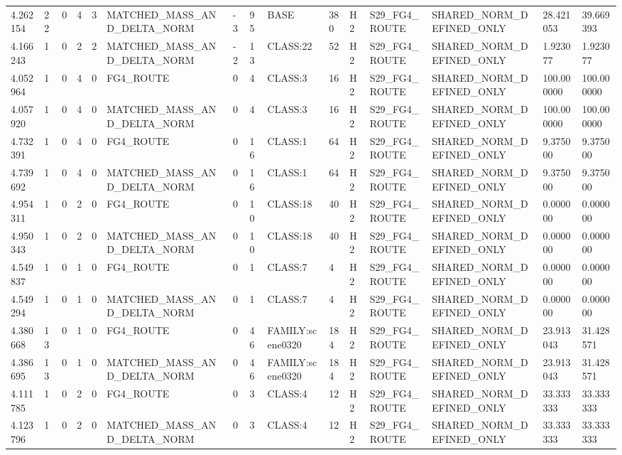\begin{tabular}{lllllllllllllll}
4.262154 & 22 & 0 & 4 & 3 & MATCHED\_MASS\_AND\_DELTA\_NORM & -3 & 95 & BASE & 380 & H2 & S29\_FG4\_ROUTE & SHARED\_NORM\_DEFINED\_ONLY & 28.421053 & 39.669393 \\
4.166243 & 1 & 0 & 2 & 2 & MATCHED\_MASS\_AND\_DELTA\_NORM & -2 & 13 & CLASS:22 & 52 & H2 & S29\_FG4\_ROUTE & SHARED\_NORM\_DEFINED\_ONLY & 1.923077 & 1.923077 \\
4.052964 & 1 & 0 & 4 & 0 & FG4\_ROUTE & 0 & 4 & CLASS:3 & 16 & H2 & S29\_FG4\_ROUTE & SHARED\_NORM\_DEFINED\_ONLY & 100.000000 & 100.000000 \\
4.057920 & 1 & 0 & 4 & 0 & MATCHED\_MASS\_AND\_DELTA\_NORM & 0 & 4 & CLASS:3 & 16 & H2 & S29\_FG4\_ROUTE & SHARED\_NORM\_DEFINED\_ONLY & 100.000000 & 100.000000 \\
4.732391 & 1 & 0 & 4 & 0 & FG4\_ROUTE & 0 & 16 & CLASS:1 & 64 & H2 & S29\_FG4\_ROUTE & SHARED\_NORM\_DEFINED\_ONLY & 9.375000 & 9.375000 \\
4.739692 & 1 & 0 & 4 & 0 & MATCHED\_MASS\_AND\_DELTA\_NORM & 0 & 16 & CLASS:1 & 64 & H2 & S29\_FG4\_ROUTE & SHARED\_NORM\_DEFINED\_ONLY & 9.375000 & 9.375000 \\
4.954311 & 1 & 0 & 2 & 0 & FG4\_ROUTE & 0 & 10 & CLASS:18 & 40 & H2 & S29\_FG4\_ROUTE & SHARED\_NORM\_DEFINED\_ONLY & 0.000000 & 0.000000 \\
4.950343 & 1 & 0 & 2 & 0 & MATCHED\_MASS\_AND\_DELTA\_NORM & 0 & 10 & CLASS:18 & 40 & H2 & S29\_FG4\_ROUTE & SHARED\_NORM\_DEFINED\_ONLY & 0.000000 & 0.000000 \\
4.549837 & 1 & 0 & 1 & 0 & FG4\_ROUTE & 0 & 1 & CLASS:7 & 4 & H2 & S29\_FG4\_ROUTE & SHARED\_NORM\_DEFINED\_ONLY & 0.000000 & 0.000000 \\
4.549294 & 1 & 0 & 1 & 0 & MATCHED\_MASS\_AND\_DELTA\_NORM & 0 & 1 & CLASS:7 & 4 & H2 & S29\_FG4\_ROUTE & SHARED\_NORM\_DEFINED\_ONLY & 0.000000 & 0.000000 \\
4.380668 & 13 & 0 & 1 & 0 & FG4\_ROUTE & 0 & 46 & FAMILY:scene0320 & 184 & H2 & S29\_FG4\_ROUTE & SHARED\_NORM\_DEFINED\_ONLY & 23.913043 & 31.428571 \\
4.386695 & 13 & 0 & 1 & 0 & MATCHED\_MASS\_AND\_DELTA\_NORM & 0 & 46 & FAMILY:scene0320 & 184 & H2 & S29\_FG4\_ROUTE & SHARED\_NORM\_DEFINED\_ONLY & 23.913043 & 31.428571 \\
4.111785 & 1 & 0 & 2 & 0 & FG4\_ROUTE & 0 & 3 & CLASS:4 & 12 & H2 & S29\_FG4\_ROUTE & SHARED\_NORM\_DEFINED\_ONLY & 33.333333 & 33.333333 \\
4.123796 & 1 & 0 & 2 & 0 & MATCHED\_MASS\_AND\_DELTA\_NORM & 0 & 3 & CLASS:4 & 12 & H2 & S29\_FG4\_ROUTE & SHARED\_NORM\_DEFINED\_ONLY & 33.333333 & 33.333333 \\

\end{tabular}
